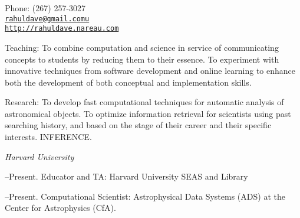 \documentclass[11pt]{article}
\makeatletter
\def\myemail{rahuldave@gmail.comu}
\def\myweb{http://rahuldave.nareau.com}
\def\myphone{(267) 257-3027}
\makeatother
\begin{document}
\begin{minipage}[t]{2.95in}
  
\end{minipage}
\hfill     
\hfill
\begin{minipage}[t]{1.7in}
  \flushright \footnotesize Phone: \myphone \\ 
  {\scriptsize  \texttt{\href{mailto:\myemail}{\myemail}}} \\
  {\scriptsize  \texttt{\href{\myweb}{\myweb}}}
\end{minipage}


\medskip

\reversemarginpar

\medskip       

\medskip
{}


\ind Teaching: To combine computation and science in service of communicating concepts to students by reducing them to their essence. To experiment with innovative techniques from software development and online learning to enhance both the development of both conceptual and implementation skills. 

\ind Research: To develop fast computational techniques for automatic analysis of astronomical objects. To optimize information retrieval for scientists using past searching history, and based on the stage of their career and their specific interests. INFERENCE.


\medskip


\noindent\emph{Harvard University \vspace{0.01in}}

--Present. Educator and TA: Harvard University SEAS and Library

--Present. Computational Scientist: Astrophysical Data Systems (ADS) at the Center for Astrophysics (CfA).      
\end{document}
